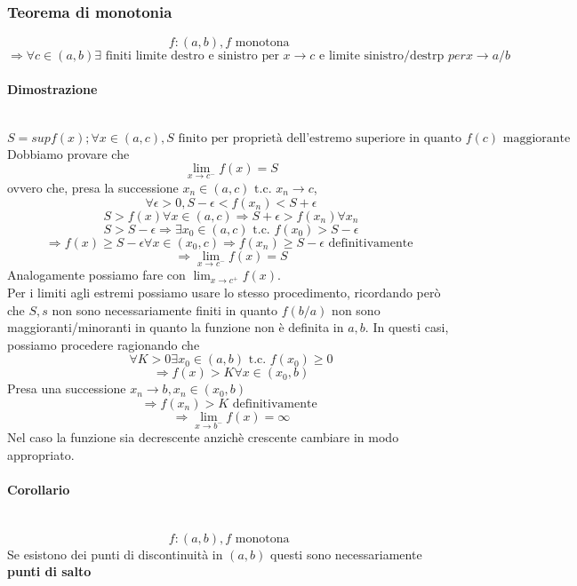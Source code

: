 \documentclass{report}
\newcommand{\subsubsubsection}[1]{\paragraph{#1}\mbox{}\\}
\begin{document}
        \subsubsection{Teorema di monotonia}
            $$f:\left(a, b\right), f \textrm{ monotona }$$
            $$\Longrightarrow \forall c \in \left(a, b\right) \exists \textrm{ finiti limite 
            destro e sinistro per } x \rightarrow c \textrm{ e limite sinistro/destrp } per x \rightarrow a/b$$
            \subsubsubsection{Dimostrazione}
                $$S = sup{f\left(x\right); \forall x \in \left(a, c\right)}, S \textrm{ finito per proprietà dell'estremo superiore in quanto }
                f\left(c\right) \textrm{ maggiorante }$$
                Dobbiamo provare che
                $$\lim_{x \to c^-} f\left(x\right) = S$$
                ovvero che, presa la successione $x_n \in \left(a, c\right)\textrm{ t.c. } x_n \rightarrow c$,
                $$\forall\epsilon > 0, S-\epsilon < f\left(x_n\right) < S+\epsilon$$
                $$S > f\left(x\right) \forall x \in \left(a, c\right) \Longrightarrow S+\epsilon > f\left(x_n\right) \forall x_n$$
                $$S > S-\epsilon \Longrightarrow \exists x_0 \in \left(a, c\right) \textrm{ t.c. } f\left(x_0\right) > S-\epsilon$$
                $$\Longrightarrow f\left(x\right) \geq S-\epsilon \forall x \in \left(x_0, c\right) \Longrightarrow f\left(x_n\right) \geq S-\epsilon \textrm{ definitivamente }$$
                $$\Longrightarrow \lim_{x \to c^-} f\left(x\right) = S$$
                Analogamente possiamo fare con $\lim_{x \to c^+} f\left(x\right)$. \\
                Per i limiti agli estremi possiamo usare lo stesso procedimento, ricordando però che $S, s$ non 
                sono necessariamente finiti in quanto $f\left(b/a\right)$ non sono maggioranti/minoranti in quanto 
                la funzione non è definita in $a, b$. In questi casi, possiamo procedere ragionando che
                $$\forall K > 0 \exists x_0 \in \left(a, b\right) \textrm{ t.c. } f\left(x_0\right) \geq 0$$
                $$\Longrightarrow f\left(x\right) > K \forall x \in \left(x_0, b\right)$$
                Presa una successione $x_n \rightarrow b, x_n \in \left(x_0, b\right)$
                $$\Longrightarrow f\left(x_n\right) > K \textrm{ definitivamente }$$
                $$\Longrightarrow \lim_{x \to b^-} f\left(x\right) = \infty$$
                Nel caso la funzione sia decrescente anzichè crescente cambiare in modo appropriato.
            \subsubsubsection{Corollario}
                $$f:\left(a, b\right), f \textrm{ monotona }$$
                Se esistono dei punti di discontinuità in $\left(a, b\right)$ questi
                sono necessariamente \textbf{punti di salto}
\end{document}
